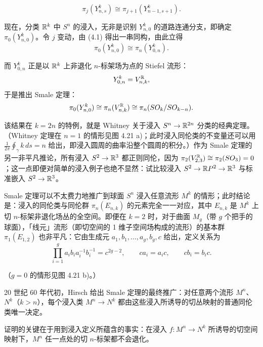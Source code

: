\begin{equation}
\pi_j(Y^k_{n,s})\cong\pi_{j+1}(Y^k_{n-1,s+1}). \tag{4.1}
\end{equation}

现在，分类 $\mathbb{R}^k$ 中 $S^n$ 的浸入，无非是识别 $Y^k_{n,0}$ 的道路连通分支，即确定 $\pi_0(Y^k_{n,0})$。令 $j$ 变动，由 (4.1) 得出一串同构，由此立得
\begin{equation}
\pi_0(Y^k_{n,0})\cong\pi_n(Y^k_{0,n}). \tag{4.2}
\end{equation}

而 $Y^k_{0,n}$ 正是以 $\mathbb{R}^k$ 上非退化 $n$-标架场为点的 Stiefel 流形：
\[
Y^k_{0,n}=V^{\mathbb{R}}_{n,k},
\]
于是推出 Smale 定理：
\[
\pi_0(Y^k_{n,0})\cong\pi_n(V^{\mathbb{R}}_{n,k})\cong\pi_n(SO_k/SO_{k-n}).
\]

该结果在 $k=2n$ 的特例，就是 Whitney 关于浸入 $S^n\to\mathbb{R}^{2n}$ 分类的经典定理。（Whitney 定理在 $n=1$ 的情形见图 4.21 a)；此时浸入同伦类的不变量还可以用 $\frac{1}{2\pi}\oint_\gamma k\,ds=n$ 给出，即浸入圆周的曲率沿整个圆周的积分。）作为 Smale 定理的另一非平凡推论，所有浸入 $S^2\to\mathbb{R}^3$ 都正则同伦，因为 $\pi_2(V^{\mathbb{R}}_{2,3})\cong\pi_2(SO_3)=0$；这一点即便对简单的浸入例子也绝不显然：试比较浸入 $S^2\to\mathbb{R}P^2\to\mathbb{R}^3$ 与标准嵌入 $S^2\to\mathbb{R}^3$。


Smale 定理可以不太费力地推广到球面 $S^n$ 浸入任意流形 $M^k$ 的情形；此时结论是：浸入的同伦类与同伦群 $\pi_n(E_{n,k})$ 的元素完全一一对应，其中 $E_{n,k}$ 是 $M^k$ 上切 $n$-标架非退化场丛的全空间。即便在 $k=2$ 时，对于曲面 $M_g$（带 $g$ 个把手的球面），「线元」流形（即切空间的 1 维子空间场构成的流形）的基本群 $\pi_1(E_{1,2})$ 也非平凡：它由生成元 $a_1,b_1,\dots,a_g,b_g,c$ 给出，定义关系为
\begin{equation}
\prod_{i=1}^{g}a_ib_ia_i^{-1}b_i^{-1}=c^{2g-2},\qquad ca_i=a_ic,\qquad cb_i=b_ic. \tag{4.3}
\end{equation}

（$g=0$ 的情形见图 4.21 b)。）

20 世纪 60 年代初，Hirsch 给出 Smale 定理的最终推广：对任意两个流形 $M^n$、$N^k$（$k>n$），每个浸入类 $M^n\to N^k$ 都由这些浸入所诱导的切丛映射的普通同伦类唯一决定。

证明的关键在于用到浸入定义所蕴含的事实：在浸入 $f:M^n\to N^k$ 所诱导的切空间映射下，$M^n$ 任一点处的切 $n$-标架都不会退化。

